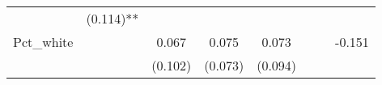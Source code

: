 \documentclass[12pt,twoside]{reedthesis}
\begin{document}
\begin{longtable}[]{@{}cccccccc@{}}
\begin{minipage}[t]{0.09\columnwidth}
  \strut
  \end{minipage} & \begin{minipage}[t]{0.10\columnwidth}\centering\strut
  (0.114)**\strut
  \end{minipage}\tabularnewline
  \begin{minipage}[t]{0.12\columnwidth}\centering\strut
  Pct\_white\strut
  \end{minipage} & \begin{minipage}[t]{0.09\columnwidth}\centering\strut
  \strut
  \end{minipage} & \begin{minipage}[t]{0.09\columnwidth}\centering\strut
  0.067\strut
  \end{minipage} & \begin{minipage}[t]{0.09\columnwidth}\centering\strut
  0.075\strut
  \end{minipage} & \begin{minipage}[t]{0.09\columnwidth}\centering\strut
  0.073\strut
  \end{minipage} & \begin{minipage}[t]{0.09\columnwidth}\centering\strut
  \strut
  \end{minipage} & \begin{minipage}[t]{0.09\columnwidth}\centering\strut
  \strut
  \end{minipage} & \begin{minipage}[t]{0.10\columnwidth}\centering\strut
  -0.151\strut
  \end{minipage}\tabularnewline
  \begin{minipage}[t]{0.12\columnwidth}\centering\strut
  \strut
  \end{minipage} & \begin{minipage}[t]{0.09\columnwidth}\centering\strut
  \strut
  \end{minipage} & \begin{minipage}[t]{0.09\columnwidth}\centering\strut
  (0.102)\strut
  \end{minipage} & \begin{minipage}[t]{0.09\columnwidth}\centering\strut
  (0.073)\strut
  \end{minipage} & \begin{minipage}[t]{0.09\columnwidth}\centering\strut
  (0.094)\strut
  \end{minipage} & \begin{minipage}[t]{0.09\columnwidth}\centering\strut
  \strut
  \end{minipage} & \begin{minipage}[t]{0.09\columnwidth}\centering\strut

\end{minipage}
\end{longtable}
\end{document}
